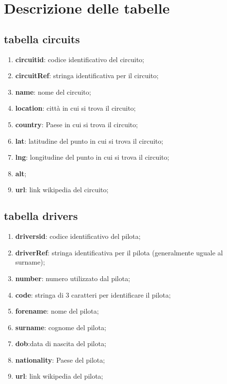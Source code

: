 \section[Descrizione delle tabelle]{Descrizione delle tabelle}
\subsection{tabella circuits}%
\begin{enumerate}
    \item\textbf{ circuitid}: codice identificativo del circuito;
    \item \textbf{circuitRef}: stringa identificativa per il circuito;
    \item \textbf{name}: nome del circuito;
    \item \textbf{location}: città in cui si trova il circuito;
    \item \textbf{country}: Paese in cui si trova il circuito;
    \item \textbf{lat}: latitudine del punto in cui si trova il circuito;
    \item \textbf{lng}: longitudine del punto in cui si trova il circuito;
    \item \textbf{alt};
    \item \textbf{url}: link wikipedia del circuito;
\end{enumerate}
\subsection{tabella drivers}%
\begin{enumerate}
    \item \textbf{driversid}: codice identificativo del pilota;
    \item \textbf{driverRef}: stringa identificativa per il pilota (generalmente uguale al surname);
    \item \textbf{number}: numero utilizzato dal pilota;
    \item \textbf{code}: stringa di 3 caratteri per identificare il pilota;
    \item \textbf{forename}: nome del pilota;
    \item \textbf{surname}: cognome del pilota;
    \item \textbf{dob}:data di nascita del pilota;
    \item \textbf{nationality}: Paese del pilota;
    \item \textbf{url}: link wikipedia del pilota;
\end{enumerate}
